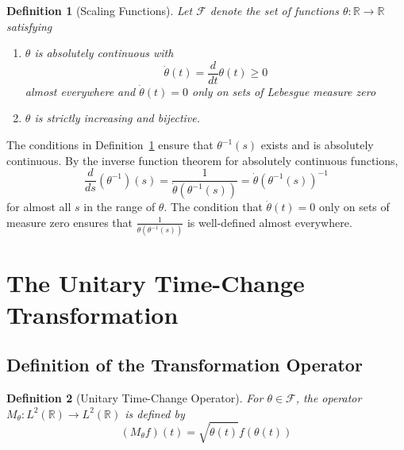 \documentclass{article}
\newtheorem{definition}{Definition}
\begin{document}
\begin{definition}
  [Scaling Functions]\label{def:scaling} Let $\mathcal{F}$ denote the set of
  functions $\theta : \mathbb{R} \to \mathbb{R}$ satisfying
  \begin{enumerate}
    \item $\theta$ is absolutely continuous with
    \begin{equation}
      \dot{\theta} (t) = \frac{d}{dt} \theta (t) \geq 0
    \end{equation}
    almost everywhere and $\dot{\theta} (t) = 0$ only on sets of Lebesgue
    measure zero
    
    \item $\theta$ is strictly increasing and bijective.
  \end{enumerate}
\end{definition}

\begin{remark}
  \label{rem:inverse_properties}The conditions in Definition~\ref{def:scaling}
  ensure that $\theta^{- 1} (s)$ exists and is absolutely continuous. By the
  inverse function theorem for absolutely continuous functions,
  \begin{equation}
    \frac{d}{ds} (\theta^{- 1}) (s) = \frac{1}{\dot{\theta} (\theta^{- 1}
    (s))} = \dot{\theta} (\theta^{- 1} (s))^{- 1}
  \end{equation}
  for almost all $s$ in the range of $\theta$. The condition that
  $\dot{\theta} (t) = 0$ only on sets of measure zero ensures that
  $\frac{1}{\dot{\theta} (\theta^{- 1} (s))}$ is well-defined almost
  everywhere.
\end{remark}

\section{The Unitary Time-Change Transformation}

\subsection{Definition of the Transformation Operator}

\begin{definition}
  [Unitary Time-Change Operator]\label{def:unitary_op} For $\theta \in
  \mathcal{F}$, the operator $M_{\theta} : L^2 (\mathbb{R}) \to L^2
  (\mathbb{R})$ is defined by
  \begin{equation}
    \label{eq:unitary_op} (M_{\theta} f) (t) = \sqrt{\dot{\theta} (t)} f
    (\theta (t))
  \end{equation}
\end{definition}
\end{document}

